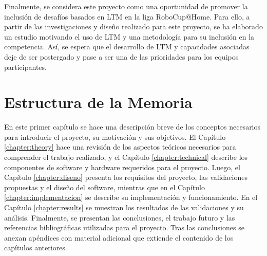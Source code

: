 Finalmente, se considera este proyecto como una oportunidad de promover la inclusión de desafíos basados en LTM en la liga RoboCup@Home. Para ello, a partir de las investigaciones y diseño realizado para este proyecto, se ha elaborado un estudio \cite{ltm_in_robocup} motivando el uso de LTM y una metodología para su inclusión en la competencia. Así, se espera que el desarrollo de LTM y capacidades asociadas deje de ser postergado y pase a ser una de las prioridades para los equipos participantes.

\vfill



\section{Estructura de la Memoria}

En este primer capítulo se hace una descripción breve de los conceptos necesarios para introducir el proyecto, su motivación y sus objetivos. El Capítulo \ref{chapter:theory} hace una revisión de los aspectos teóricos necesarios para comprender el trabajo realizado, y el Capítulo \ref{chapter:technical} describe los componentes de software y hardware requeridos para el proyecto. Luego, el Capítulo \ref{chapter:diseno} presenta los requisitos del proyecto, las validaciones propuestas y el diseño del software, mientras que en el Capítulo \ref{chapter:implementacion} se describe su implementación y funcionamiento. En el Capítulo \ref{chapter:results} se muestran los resultados de las validaciones y su análisis. Finalmente, se presentan las conclusiones, el trabajo futuro y las referencias bibliográficas utilizadas para el proyecto. Tras las conclusiones se anexan apéndices con material adicional que extiende el contenido de los capítulos anteriores.

